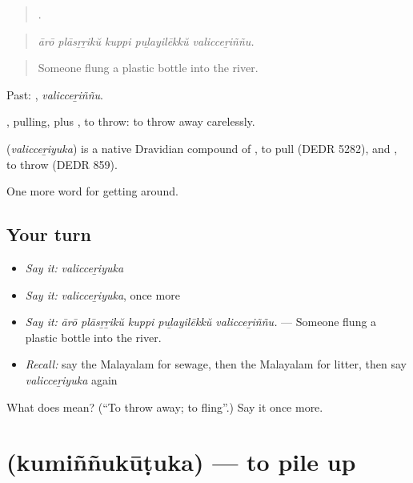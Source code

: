 \begin{quote}
    .
\end{quote}

\begin{quote}
\emph{ārō plāsṟṟikŭ kuppi puḻayilēkkŭ valicceṟiññu.}
\end{quote}

\begin{quote}
Someone flung a plastic bottle into the river.
\end{quote}

Past: , \emph{valicceṟiññu}.

, pulling, plus , to throw: to throw away carelessly.

\begin{cousinweb}
\textbf{} (\emph{valicceṟiyuka}) is a native Dravidian compound of , to pull (DEDR 5282), and , to throw (DEDR 859).
\end{cousinweb}

\begin{grammarlens}[title={What you've built}]
One more word for getting around.
\end{grammarlens}

\subsection*{Your turn}
\begin{itemize}
\raggedright
  \item \emph{Say it:} \emph{valicceṟiyuka}
  \item \emph{Say it:} \emph{valicceṟiyuka}, once more
  \item \emph{Say it:} \emph{ārō plāsṟṟikŭ kuppi puḻayilēkkŭ valicceṟiññu.} — Someone flung a plastic bottle into the river.
  \item \emph{Recall:} say the Malayalam for sewage, then the Malayalam for litter, then say \emph{valicceṟiyuka} again
\end{itemize}

\begin{tcolorbox}[breakable,colback=teal!4,colframe=teal!35!black,title={Before you move on}]
What does  mean? (\textquotedblleft{}To throw away; to fling\textquotedblright{}.) Say it once more.
\end{tcolorbox}
\section[\texorpdfstring{\ml{കുമിഞ്ഞുകൂടുക} (kumiññukūṭuka)}{കുമിഞ്ഞുകൂടുക (kumiññukūṭuka)}]{ (kumiññukūṭuka) — to pile up}

